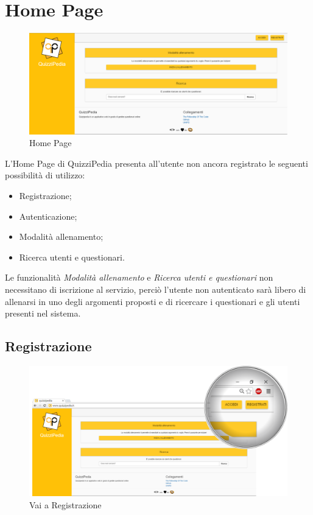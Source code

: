 \newpage
\section{Home Page}

\label{Home Page}
\begin{figure}[ht]
	\centering
	\includegraphics[scale=0.43]{img/homePage.png}
	\caption{Home Page}
\end{figure}
\FloatBarrier

L'Home Page di QuizziPedia presenta all'utente non ancora registrato le seguenti possibilità di utilizzo:
\begin{itemize}
	\item Registrazione;
	\item Autenticazione;
	\item Modalità allenamento;
	\item Ricerca utenti e questionari.
\end{itemize}
Le funzionalità \textit{Modalità allenamento} e \textit{Ricerca utenti e questionari} non necessitano di iscrizione al servizio, perciò l'utente non autenticato sarà libero di allenarsi in uno degli argomenti proposti e di ricercare i questionari e gli utenti presenti nel sistema.

\newpage
\subsection{Registrazione}

\label{Registrazione}
\begin{figure}[ht]
	\centering
	\includegraphics[scale=0.80]{img/vai_registrazione.png}
	\caption{Vai a Registrazione}
\end{figure}
\FloatBarrier

